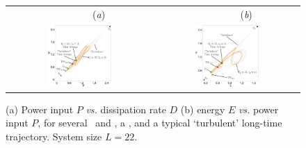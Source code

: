 \begin{figure}[t]
\begin{center}
 \begin{tabular}{cc}
        ~~~~~~~~(\textit{a})                        &   ~~~~~~~~(\textit{b}) \\
    \includegraphics[width=0.46\textwidth, clip=true]{figs/energyBalance_pst.eps}  & \includegraphics[width=0.46\textwidth, clip=true]{figs/equivaEP_pst.eps}

  \end{tabular}
\end{center}
\caption{
(a) Power input $P$ {\em vs.}
dissipation rate $D$
(b) energy $E$  {\em vs.}
power input $P$,   for several  \eqva\ and \reqva,
a \rpo , and a typical `turbulent' long-time trajectory.
System size $L=22$.
        }
\label{f:drivedrag}
\end{figure}

